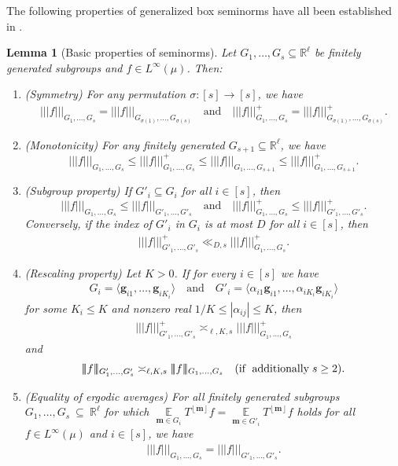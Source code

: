 \documentclass[11pt]{amsart}
\newtheorem{lemma}{Lemma}[section]
\theoremstyle{definition}
\DeclareMathOperator*{\E}{\mathbb{E}}
\newcommand{\R}{{\mathbb R}}
\newcommand{\bm}{{\mathbf{m}}}
\newcommand{\bg}{{\mathbf{g}}}
\newcommand{\nnorm}[1]{\lvert\!|\!| #1|\!|\!\rvert}
\newcommand{\1}{{\mathbf{1}}}
\newcommand{\floor}[1]{{\left \lfloor #1 \right \rfloor}}
\begin{document}
The following properties of generalized box seminorms have all been established in \cite[Section 3]{DKKST24}.
\begin{lemma}[Basic properties of seminorms]\label{L: basic properties of seminorms}
    Let $G_1, \ldots, G_s\subseteq\R^\ell$ be finitely generated subgroups and $f\in L^\infty(\mu)$. Then: 
    \begin{enumerate}
        \item (Symmetry) For any permutation $\sigma:[s]\to[s]$, we have
        \begin{align*}
            \nnorm{f}_{G_1, \ldots, G_s} = \nnorm{f}_{G_{\sigma(1)}, \ldots, G_{\sigma(s)}}\quad \textrm{and}\quad \nnorm{f}_{G_1, \ldots, G_s}^+ = \nnorm{f}_{G_{\sigma(1)}, \ldots, G_{\sigma(s)}}^+.
        \end{align*}
        \item (Monotonicity) For any finitely generated $G_{s+1}\subseteq\R^\ell$, we have
        $$\nnorm{f}_{G_1, \ldots, G_s}\leq\nnorm{f}_{G_1, \ldots, G_s}^+\leq\nnorm{f}_{G_1, \ldots, G_{s+1}}\leq\nnorm{f}_{G_1, \ldots, G_{s+1}}^+.$$
        \item (Subgroup property) If $G'_i\subseteq G_i$ for all $i\in[s]$, then $$\nnorm{f}_{G_1, \ldots, G_s}\leq\nnorm{f}_{G'_1, \ldots, G'_s} \quad \textrm{and}\quad \nnorm{f}^+_{G_1, \ldots, G_s}\leq\nnorm{f}_{G'_1, \ldots, G'_s}^+.$$ Conversely,  if the index of $G'_{i}$ in $G_{i}$ is at most $D$ for all $i\in[s]$, then %
\begin{align*}
\nnorm{f}_{G'_1, \ldots, G'_s}^+\ll_{D,s} \nnorm{f}_{G_1, \ldots, G_s}^+.
\end{align*} 
        \item (Rescaling property) Let $K>0$. If for every $i\in[s]$ we have
        \begin{align*}
            G_i = \langle \bg_{i1}, \ldots, \bg_{iK_i}\rangle\quad \textrm{and}\quad G'_i = \langle \alpha_{i1}\bg_{i1}, \ldots, \alpha_{iK_i} \bg_{iK_i}\rangle 
        \end{align*}
        for some $K_i\leq K$ and nonzero real $1/K\leq |\alpha_{ij}|\leq K$, then
    \begin{align*}
        \nnorm{f}^+_{G'_1, \ldots, G'_s}\asymp_{\ell, K, s} \nnorm{f}^+_{G_1, \ldots, G_s}
    \end{align*}
    and
    \begin{align*}
        \nnorm{f}_{G'_1, \ldots, G'_s}\asymp_{\ell, K, s} \nnorm{f}_{G_1, \ldots, G_s} \quad \textrm{(if\; additionally}\; s\geq 2).
    \end{align*}
    \item (Equality of ergodic averages) For all finitely generated subgroups $G_1, \ldots, G_s~\subseteq~\R^\ell$ for which  $\E\limits_{\bm\in G_i} T^{\floor{\bm}}f = \E\limits_{\bm\in G'_i} T^{\floor{\bm}}f$ holds for all $f\in L^\infty(\mu)$ and $i\in[s]$, we have
    \begin{align*}
        \nnorm{f}_{G_1, \ldots, G_s}=\nnorm{f}_{G'_1, \ldots, G'_s}.
    \end{align*}
    \end{enumerate}
\end{lemma}
\end{document}
